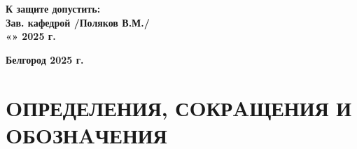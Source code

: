 \begin{titlepage}
    \vfill
    
    \centering
    \begin{minipage}{0.7\textwidth}
        \textbf{К защите допустить:\\
        Зав. кафедрой \underline{\hspace{4cm}} /Поляков В.М./\\
        «\underline{\hspace{1cm}}» \underline{\hspace{2cm}} 2025 г.}
    \end{minipage}
    
    \vfill
    
    \textbf{Белгород 2025 г.}
    
\end{titlepage}

\newpage
{}
\section*{OПРЕДЕЛЕНИЯ, СOКРAЩЕНИЯ И OБOЗНAЧЕНИЯ}

